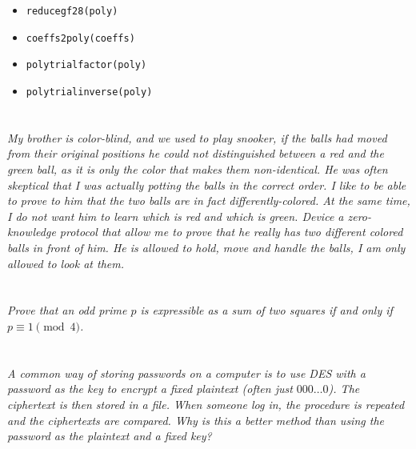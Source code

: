 \documentclass[12pt]{article}
\begin{document}
    \begin{itemize}
        \item \texttt{reduce\textunderscore{}gf28(poly)}
        \item \texttt{coeffs2poly(coeffs)}
        \item \texttt{poly\textunderscore{}trial\textunderscore{}factor(poly)}
        \item \texttt{poly\textunderscore{}trial\textunderscore{}inverse(poly)}
    \end{itemize}

\newpage

\section{} \textit{My brother is color-blind, and we used to play snooker, if the balls had moved from their original positions he could not distinguished between a red and the green ball, as it is only the color that makes them non-identical. He was often skeptical that I was actually potting the balls in the correct order. I like to be able to prove to him that the two balls are in fact differently-colored. At the same time, I do not want him to learn which is red and which is green. Device a zero-knowledge protocol that allow me to prove that he really has two different colored balls in front of him. He is allowed to hold, move and handle the balls, I am only allowed to look at them. }

\newpage

\section{} \textit{Prove that an odd prime $p$ is expressible as a sum of two squares if and only if $p \equiv 1 \pmod{4}$.}

\newpage

\section{} \textit{A common way of storing passwords on a computer is to use DES with a password as the key to encrypt a fixed plaintext (often just $000\dots0$). The ciphertext is then stored in a file. When someone log in, the procedure is repeated and the ciphertexts are compared. Why is this a better method than using the password as the plaintext and a fixed key?}

\newpage
\end{document}

